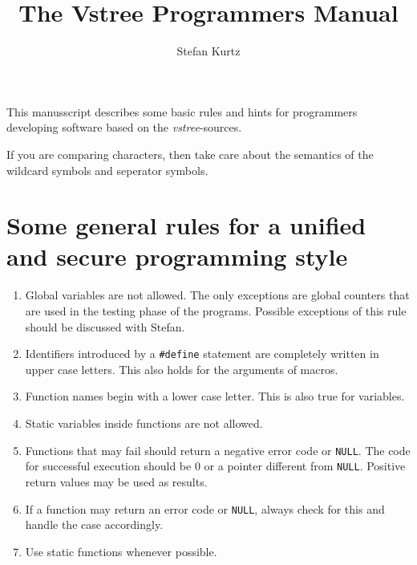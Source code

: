 \documentclass[12pt]{article}
\title{The Vstree Programmers Manual}
\author{Stefan Kurtz}
\begin{document}
\maketitle
This manusscript describes some  basic rules and hints
for programmers developing software based on the 
\emph{vstree}-sources.

If you are comparing characters, then take care about the semantics
of the wildcard symbols and seperator symbols.

\section{Some general rules for a unified and secure programming style}
\begin{enumerate}
\item
Global variables are not allowed. The only exceptions are global counters
that are used in the testing phase of the programs. 
Possible exceptions of this rule should be discussed with Stefan.
\item
Identifiers introduced by a \texttt{\#define} statement are completely
written in upper case letters. This also holds for the arguments of
macros.
\item
Function names begin with a lower case letter. This is also true for
variables.
\item
Static variables inside functions are not allowed.
\item
Functions that may fail should return a negative error code or \texttt{NULL}.
The code for successful execution should be 0 or a pointer different from
\texttt{NULL}. Positive return values may be used as results.
\item
If a function may return an error code or \texttt{NULL}, always check for
this and handle the case accordingly.
\item
Use static functions whenever possible.
\end{enumerate}
\end{document}
